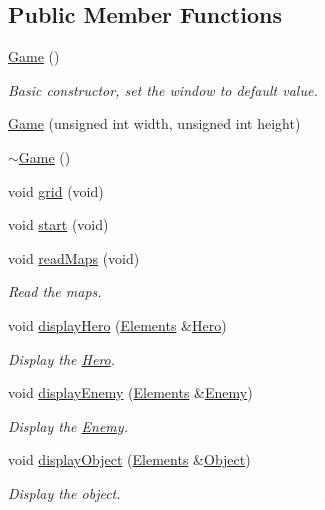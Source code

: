 \subsection*{Public Member Functions}
\begin{DoxyCompactItemize}
\item 
\hyperlink{class_game_ad59df6562a58a614fda24622d3715b65}{Game} ()
\begin{DoxyCompactList}\small\item\em Basic constructor, set the window to default value. \end{DoxyCompactList}\item 
\hyperlink{class_game_a20220a5fdc31f41d6c642f70204799d0}{Game} (unsigned int width, unsigned int height)
\item 
\hyperlink{class_game_ae3d112ca6e0e55150d2fdbc704474530}{$\sim$\-Game} ()
\item 
void \hyperlink{class_game_a616466e4850732139841c148ed18c05f}{grid} (void)
\item 
void \hyperlink{class_game_a662a1969275a12a8ffebf2e53e8c843a}{start} (void)
\item 
void \hyperlink{class_game_af06f40bacd46f8facba328648cb221b5}{read\-Maps} (void)
\begin{DoxyCompactList}\small\item\em Read the maps. \end{DoxyCompactList}\item 
void \hyperlink{class_game_a82b79f027868bb70c2325f473a0270a9}{display\-Hero} (\hyperlink{class_elements}{Elements} \&\hyperlink{class_hero}{Hero})
\begin{DoxyCompactList}\small\item\em Display the \hyperlink{class_hero}{Hero}. \end{DoxyCompactList}\item 
void \hyperlink{class_game_abbb01372bc9b6703a49d5960fb62ff0b}{display\-Enemy} (\hyperlink{class_elements}{Elements} \&\hyperlink{class_enemy}{Enemy})
\begin{DoxyCompactList}\small\item\em Display the \hyperlink{class_enemy}{Enemy}. \end{DoxyCompactList}\item 
void \hyperlink{class_game_a6ce6fb87e236965d8b1d3ca7143337f6}{display\-Object} (\hyperlink{class_elements}{Elements} \&\hyperlink{class_object}{Object})
\begin{DoxyCompactList}\small\item\em Display the object. \end{DoxyCompactList}\item 

\end{DoxyCompactItemize}
